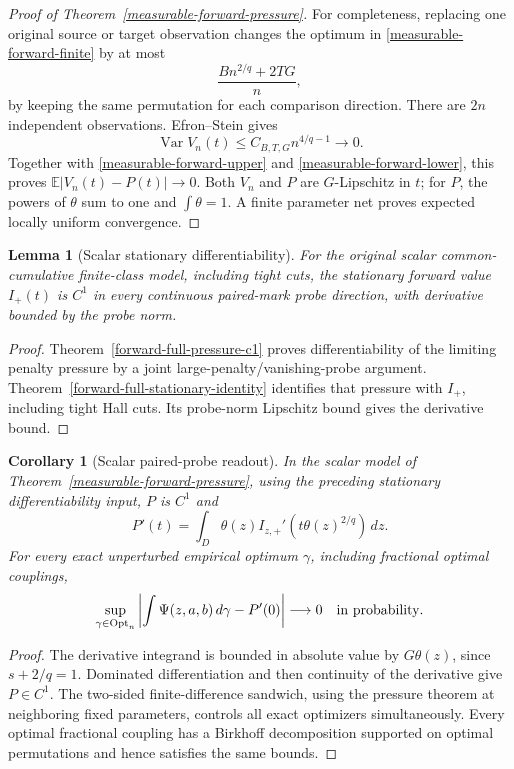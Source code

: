 \documentclass[11pt,reqno]{amsart}
\newtheorem{lemma}[theorem]{Lemma}
\newtheorem{corollary}[theorem]{Corollary}
\theoremstyle{definition}
\theoremstyle{remark}
\numberwithin{equation}{section}
\newcommand{\E}{\mathbb E}
\begin{document}
\begin{proof}[Proof of Theorem~\ref{measurable-forward-pressure}]
For completeness, replacing one original source or target observation
changes the optimum in \eqref{measurable-forward-finite} by at most
\[
                   \frac{Bn^{2/q}+2TG}{n},
\]
by keeping the same permutation for each comparison direction.
There are \(2n\) independent observations. Efron--Stein gives
\begin{equation}
\label{measurable-forward-variance}
             \operatorname{Var}V_n(t)
                 \le C_{B,T,G}n^{4/q-1}\longrightarrow0.
\end{equation}
Together with \eqref{measurable-forward-upper} and
\eqref{measurable-forward-lower}, this proves
\(\E|V_n(t)-P(t)|\to0\). Both \(V_n\) and \(P\) are
\(G\)-Lipschitz in \(t\); for \(P\), the powers of \(\theta\)
sum to one and \(\int\theta=1\).
A finite parameter net proves expected locally uniform convergence.
\end{proof}

\begin{lemma}[Scalar stationary differentiability]
\label{measurable-forward-c1-input}
For the original scalar common-cumulative finite-class model,
including tight cuts, the stationary forward value \(I_+(t)\) is \(C^1\)
in every continuous paired-mark probe direction, with derivative bounded
by the probe norm.
\end{lemma}
\begin{proof}
Theorem~\ref{forward-full-pressure-c1} proves differentiability of the
limiting penalty pressure by a joint large-penalty/vanishing-probe
argument. Theorem~\ref{forward-full-stationary-identity} identifies that
pressure with \(I_+\), including tight Hall cuts. Its probe-norm
Lipschitz bound gives the derivative bound.
\end{proof}

\begin{corollary}[Scalar paired-probe readout]
\label{measurable-forward-readout}
In the scalar model of Theorem~\ref{measurable-forward-pressure},
using the preceding stationary differentiability input, \(P\) is \(C^1\)
and
\[
 P'(t)=\int_D\theta(z)I_{z,+}'(t\theta(z)^{2/q})\,dz.
\]
For every exact unperturbed empirical optimum \(\gamma\),
including fractional optimal couplings,
\[
 \sup_{\gamma\in\operatorname{Opt}_n}
 \left|\int\Psi(z,a,b)\,d\gamma-P'(0)\right|
                           \longrightarrow0
                           \quad\hbox{in probability}.
\]
\end{corollary}
\begin{proof}
The derivative integrand is bounded in absolute value by
\(G\theta(z)\), since \(s+2/q=1\). Dominated differentiation
and then continuity of the derivative give \(P\in C^1\).
The two-sided finite-difference sandwich, using the pressure theorem
at neighboring fixed parameters, controls all exact optimizers
simultaneously. Every optimal fractional coupling has a Birkhoff
decomposition supported on optimal permutations and hence satisfies
the same bounds.
\end{proof}
\end{document}
